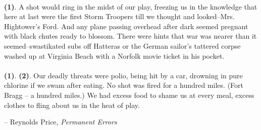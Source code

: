 \documentclass{article}
\begin{document}
\begin{enumerate}
  \paragraph{} \textbf{(1)}. A shot would ring in the midst of our play, freezing us in the
  knowledge that here at last were the first Storm Troopers till we
  thought and looked--Mrs. Hightower's Ford. And any plane passing
  overhead after dark seemed pregnant with black chutes ready to
  blossom. There were hints that war was nearer than it
  seemed--swastikated subs off Hatteras or the German sailor's tattered
  corpse washed up at Virginia Beach with a Norfolk movie ticket in his
  pocket.
  \paragraph{} \textbf{(1)}. \textbf{(2)}. Our deadly threats were polio, being hit by a car, drowning in
  pure chlorine if we swam after eating. No shot was fired for a
  hundred miles. (Fort Bragg -- a hundred miles.) We had excess food
  to shame us at every meal, excess clothes to fling about us in the
  heat of play.

  \hfill -- Reynolds Price, \textit{Permanent Errors}
\end{enumerate}



\end{document}
